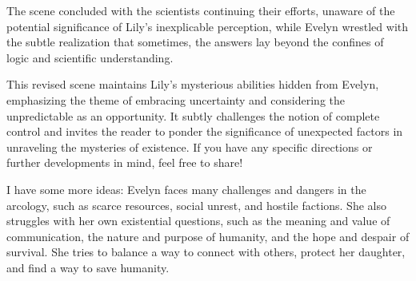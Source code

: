 \begin{aquote}
    The scene concluded with the scientists continuing their efforts, unaware of the potential significance of Lily's inexplicable perception, while Evelyn wrestled with the subtle realization that sometimes, the answers lay beyond the confines of logic and scientific understanding.\medskip

    This revised scene maintains Lily's mysterious abilities hidden from Evelyn, emphasizing the theme of embracing uncertainty and considering the unpredictable as an opportunity. It subtly challenges the notion of complete control and invites the reader to ponder the significance of unexpected factors in unraveling the mysteries of existence. If you have any specific directions or further developments in mind, feel free to share!
\end{aquote}

\begin{qquote}
    I have some more ideas: Evelyn faces many challenges and dangers in the arcology, such as scarce resources, social unrest, and hostile factions. She also struggles with her own existential questions, such as the meaning and value of communication, the nature and purpose of humanity, and the hope and despair of survival. She tries to balance a way to connect with others, protect her daughter, and find a way to save humanity.
\end{qquote}

